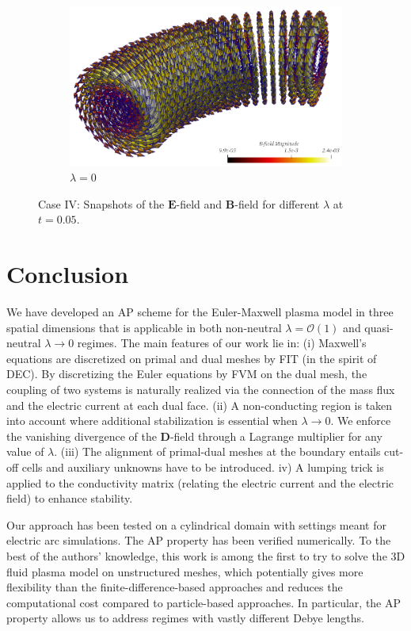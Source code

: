\documentclass{article}
\begin{document}
\begin{figure}
\begin{subfigure}[b]{\textwidth}
        \includegraphics[scale=0.3]{paper_version/figures/B-field_lamnbda-0_bend.png}
        \caption{\colorbox{yellow!30}{$\lambda = 0$}}
    \end{subfigure}
    \caption{Case IV: Snapshots of the $\mathbf{E}$-field and $\mathbf{B}$-field for different $\lambda$ at $t = 0.05$.}
    \label{fig:3d_vec_field_E_B_bend}
\end{figure}

\section{Conclusion}

We have developed an AP scheme for the Euler-Maxwell plasma model in three spatial
dimensions that is applicable in both non-neutral $\lambda = \mathcal{O}(1)$ and
quasi-neutral $\lambda \rightarrow 0$ regimes. The main features of our work lie in: (i)
Maxwell's equations are discretized on primal and dual meshes by FIT (in the spirit of
DEC). By discretizing the Euler equations by FVM on the dual mesh, the coupling of two systems
is naturally realized via the connection of the mass flux and the electric current at each
dual face. (ii) A non-conducting region is taken into account where additional
stabilization is essential when $\lambda \rightarrow 0$. We enforce the vanishing
divergence of the $\mathbf{D}$-field through a Lagrange multiplier for any value of
$\lambda$. (iii) The alignment of primal-dual meshes at the boundary entails cut-off cells
and auxiliary unknowns have to be introduced. iv) A lumping trick is applied to the
conductivity matrix (relating the electric current and the electric field) to enhance
stability.

Our approach has been tested on a cylindrical domain with settings meant for electric arc
simulations. The AP property has been verified numerically. To the best of the authors'
knowledge, this work is among the first to try to solve the 3D fluid plasma model on
unstructured meshes, which potentially gives more flexibility than the
finite-difference-based approaches and reduces the computational cost compared to
particle-based approaches. In particular, the AP property allows us to address regimes
with vastly different Debye lengths.


\end{document}
